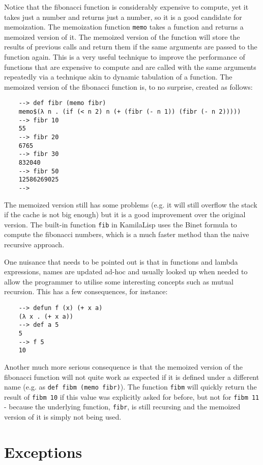 Notice that the fibonacci function is considerably expensive to compute, yet it takes just a number and returns just a number, so it is a good candidate for memoization. The memoization function \verb|memo| takes a function and returns a memoized version of it. The memoized version of the function will store the results of previous calls and return them if the same arguments are passed to the function again. This is a very useful technique to improve the performance of functions that are expensive to compute and are called with the same arguments repeatedly via a technique akin to dynamic tabulation of a function. The memoized version of the fibonacci function is, to no surprise, created as follows:

\begin{Verbatim}
    --> def fibr (memo fibr)
    memo$(λ n . (if (< n 2) n (+ (fibr (- n 1)) (fibr (- n 2)))))
    --> fibr 10
    55
    --> fibr 20
    6765
    --> fibr 30
    832040
    --> fibr 50
    12586269025
    -->
\end{Verbatim}

The memoized version still has some problems (e.g. it will still overflow the stack if the cache is not big enough) but it is a good improvement over the original version. The built-in function \verb|fib| in KamilaLisp uses the Binet formula to compute the fibonacci numbers, which is a much faster method than the naive recursive approach.

One nuisance that needs to be pointed out is that in functions and lambda expressions, names are updated ad-hoc and usually looked up when needed to allow the programmer to utilise some interesting concepts such as mutual recursion. This has a few consequences, for instance:

\begin{Verbatim}
    --> defun f (x) (+ x a)
    (λ x . (+ x a))
    --> def a 5
    5
    --> f 5
    10
\end{Verbatim}

Another much more serious consequence is that the memoized version of the fibonacci function will not quite work as expected if it is defined under a different name (e.g. as \verb|def fibm (memo fibr)|). The function \verb|fibm| will quickly return the result of \verb|fibm 10| if this value was explicitly asked for before, but not for \verb|fibm 11| - because the underlying function, \verb|fibr|, is still recursing and the memoized version of it is simply not being used.

\section{Exceptions}

